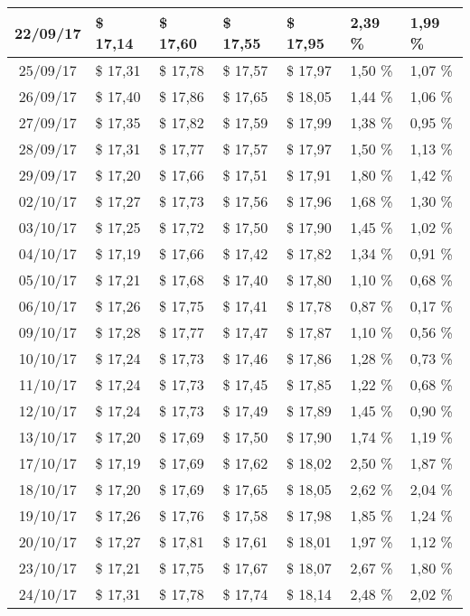 \begin{center}
\begin{longtable}{|c|p{1.5cm}|p{1.5cm}|p{1.5cm}|p{1.5cm}|p{1.5cm}|p{1.5cm}|}
22/09/17 & \$ 17,14 & \$ 17,60 & \$ 17,55 & \$ 17,95 & 2,39 \% & 1,99 \% \\ \hline
25/09/17 & \$ 17,31 & \$ 17,78 & \$ 17,57 & \$ 17,97 & 1,50 \% & 1,07 \% \\ \hline
26/09/17 & \$ 17,40 & \$ 17,86 & \$ 17,65 & \$ 18,05 & 1,44 \% & 1,06 \% \\ \hline
27/09/17 & \$ 17,35 & \$ 17,82 & \$ 17,59 & \$ 17,99 & 1,38 \% & 0,95 \% \\ \hline
28/09/17 & \$ 17,31 & \$ 17,77 & \$ 17,57 & \$ 17,97 & 1,50 \% & 1,13 \% \\ \hline
29/09/17 & \$ 17,20 & \$ 17,66 & \$ 17,51 & \$ 17,91 & 1,80 \% & 1,42 \% \\ \hline
02/10/17 & \$ 17,27 & \$ 17,73 & \$ 17,56 & \$ 17,96 & 1,68 \% & 1,30 \% \\ \hline
03/10/17 & \$ 17,25 & \$ 17,72 & \$ 17,50 & \$ 17,90 & 1,45 \% & 1,02 \% \\ \hline
04/10/17 & \$ 17,19 & \$ 17,66 & \$ 17,42 & \$ 17,82 & 1,34 \% & 0,91 \% \\ \hline
05/10/17 & \$ 17,21 & \$ 17,68 & \$ 17,40 & \$ 17,80 & 1,10 \% & 0,68 \% \\ \hline
06/10/17 & \$ 17,26 & \$ 17,75 & \$ 17,41 & \$ 17,78 & 0,87 \% & 0,17 \% \\ \hline
09/10/17 & \$ 17,28 & \$ 17,77 & \$ 17,47 & \$ 17,87 & 1,10 \% & 0,56 \% \\ \hline
10/10/17 & \$ 17,24 & \$ 17,73 & \$ 17,46 & \$ 17,86 & 1,28 \% & 0,73 \% \\ \hline
11/10/17 & \$ 17,24 & \$ 17,73 & \$ 17,45 & \$ 17,85 & 1,22 \% & 0,68 \% \\ \hline
12/10/17 & \$ 17,24 & \$ 17,73 & \$ 17,49 & \$ 17,89 & 1,45 \% & 0,90 \% \\ \hline
13/10/17 & \$ 17,20 & \$ 17,69 & \$ 17,50 & \$ 17,90 & 1,74 \% & 1,19 \% \\ \hline
17/10/17 & \$ 17,19 & \$ 17,69 & \$ 17,62 & \$ 18,02 & 2,50 \% & 1,87 \% \\ \hline
18/10/17 & \$ 17,20 & \$ 17,69 & \$ 17,65 & \$ 18,05 & 2,62 \% & 2,04 \% \\ \hline
19/10/17 & \$ 17,26 & \$ 17,76 & \$ 17,58 & \$ 17,98 & 1,85 \% & 1,24 \% \\ \hline
20/10/17 & \$ 17,27 & \$ 17,81 & \$ 17,61 & \$ 18,01 & 1,97 \% & 1,12 \% \\ \hline
23/10/17 & \$ 17,21 & \$ 17,75 & \$ 17,67 & \$ 18,07 & 2,67 \% & 1,80 \% \\ \hline
24/10/17 & \$ 17,31 & \$ 17,78 & \$ 17,74 & \$ 18,14 & 2,48 \% & 2,02 \% \\ \hline

\end{longtable}
\end{center}
